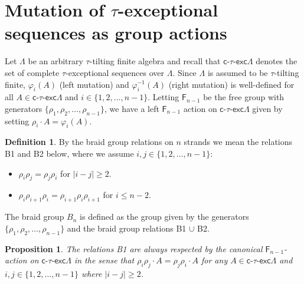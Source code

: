 \documentclass[11pt]{amsart}
\newcommand{\ctauexc}[1]{\ensuremath{\mathsf{c}\text{-}\tau\text{-}\mathsf{exc} #1}}
\newcommand{\freegroup}[1]{\ensuremath{\mathsf{F}_{#1}}}
\newtheorem{proposition}[theorem]{Proposition}
\theoremstyle{definition}
\newtheorem{definition}[theorem]{Definition}
\begin{document}
\section{Mutation of $\tau$-exceptional sequences as group actions}

Let $\Lambda$ be an arbitrary $\tau$-tilting finite algebra and recall that $\ctauexc{\Lambda}$ denotes the set of complete $\tau$-exceptional sequences over $\Lambda$. Since $\Lambda$ is assumed to be $\tau$-tilting finite, $\varphi_i(A)$ (left mutation) and $\varphi_i^{-1}(A)$ (right mutation) is well-defined for all $A \in \ctauexc{\Lambda}$ and $i \in \{1,2,\dots,n-1\}$. Letting \freegroup{n-1} be the free group with generators $\{\rho_1,\rho_2,\dots,\rho_{n-1}\}$, we have a left \freegroup{n-1} action on $\ctauexc{\Lambda}$ given by setting $\rho_i \cdot A = \varphi_i(A)$. 

\begin{definition}\label{def:braidgroup_relations}
    By the braid group relations on $n$ strands we mean the relations B1 and B2 below, where we assume $i,j \in \{1,2,\dots,n-1\}$: \begin{itemize}
         \item[\quad B1:] $\rho_i\rho_j = \rho_j\rho_i$ for $|i-j|\geq 2$.
        \item[\quad B2:] $\rho_{i}\rho_{i+1}\rho_{i} = \rho_{i+1}\rho_{i}\rho_{i+1}$ for $i\leq n-2$.
    \end{itemize}

    The braid group $B_n$ is defined as the group given by the generators $\{ \rho_1,\rho_2,\dots,\rho_{n-1} \}$ and the braid group relations B1 $\cup$ B2. 

\end{definition}

\begin{proposition}\label{prop:b1_relations_holds}
    The relations B1 are always respected by the canonical $\freegroup{n-1}$-action on $\ctauexc{\Lambda}$ in the sense that $\rho_i\rho_j\cdot A = \rho_j \rho_i \cdot A$ for any $A \in \ctauexc{\Lambda}$ and $i,j \in \{1,2,\dots,n-1\}$ where $|i-j|\geq 2$.
\end{proposition}
\end{document}
